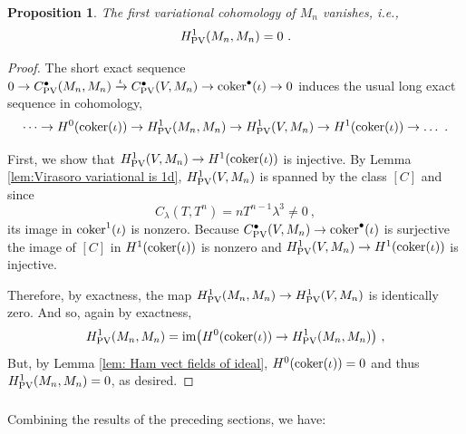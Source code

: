 \documentclass[11pt]{amsart}
\numberwithin{equation}{section}
\newtheorem{prop}[theo]{Proposition}
\theoremstyle{definition}
\newcommand{\im}{{\textup{im}}}
\newcommand{\coker}{{\textup{coker}}}
\newcommand{\0}{{\textbf{0}}}
\def \ie{{\it i.e.}}
\begin{document}
\begin{prop}\label{prop:var of min model vanishes}
	The first variational cohomology of $M_n$ vanishes, \ie,
	\[
	H^1_{\rm PV}(M_n,M_n) =0~.
	\]
\end{prop}
\begin{proof}
	The short exact sequence $0 \rightarrow C^\bullet_{\rm PV}(M_n,M_n) \xrightarrow{\iota} C^\bullet_{\rm PV}(V,M_n) \rightarrow \coker^\bullet(\iota) \rightarrow 0$ induces the usual long exact sequence in cohomology, 
	\begin{equation}
		\dots \rightarrow H^0(\coker(\iota)) \rightarrow H^1_{\rm PV}(M_n,M_n) \rightarrow H^1_{\rm PV}(V,M_n) \rightarrow H^1(\coker(\iota)) \rightarrow \dots~.
	\end{equation}

 First, we show that $H^1_{\rm PV}(V,M_n)\rightarrow H^1(\coker(\iota))$ is injective. By Lemma \ref{lem:Virasoro variational is 1d}, $H^1_{\rm PV}(V,M_n)$ is spanned by the class $[C]$ and since 
 \[
	C_\lambda(T,T^n) = nT^{n-1} \lambda^3 \neq0~,
 \]
 its image in $\coker^1(\iota)$ is nonzero. Because $C^\bullet_{\rm PV}(V,M_n)\rightarrow \coker^\bullet(\iota)$ is surjective the image of $[C]$ in $H^1(\coker(\iota))$ is nonzero and $H^1_{\rm PV}(V,M_n)\rightarrow H^1(\coker(\iota))$ is injective.

 Therefore, by exactness, the map $H^1_{\rm PV}(M_n,M_n)\rightarrow H^1_{\rm PV}(V,M_n)$ is identically zero. And so, again by exactness,
 \[
 H^1_{\rm PV}(M_n,M_n) = \im\big( H^0(\coker(\iota)) \rightarrow H^1_{\rm PV}(M_n,M_n)\big)~,
 \]
 But, by Lemma \ref{lem: Ham vect fields of ideal}, $H^0(\coker(\iota))=0$ and thus $H^1_{\rm PV}(M_n,M_n)=0$, as desired.
\end{proof}

\subsubsection{}
Combining the results of the preceding sections, we have:
\end{document}
